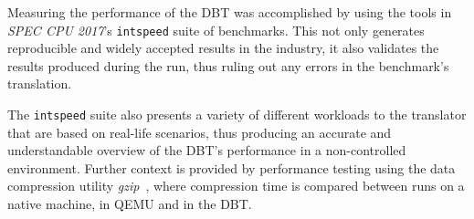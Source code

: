 
\begin{comment}
\begin{figure}[h]
	\centering
	\begin{tikzpicture}
		\begin{axis}[%
			title = {Example bar graph},
			ybar,
			area legend,
			ylabel = {Value in some unit},
			xtick = data,
			xtick style = {draw = none},
			ytick = {0, 2500, 5000, 7500, 10000, 12500},
			scaled y ticks = false,
			symbolic x coords={First category, Second category, Third category},
			ymin = 0, ymax = 12500,
			ymajorgrids = true,
			height = 6.0cm,
			width = \linewidth,
			legend style = {
				at = {(0.5, -0.25)},
				anchor = north,
				legend columns = 3,
				column sep = 0.2cm
			}
		]	
			\addplot+ [
				fill=era-dbt-1,
				draw=black
			] coordinates {
				(First category, 3061)
				(Second category, 10930)
				(Third category, 10971)
			};
			
			\addplot+ [
				fill=era-qemu,
				draw=black
			] coordinates {
				(First category, 3061)
				(Second category, 9092)
				(Third category, 5042)
			};
			
			\addplot+ [
				fill=era-native,
				draw=black
			] coordinates {
				(First category, 4043)
				(Second category, 6092)
				(Third category, 7971)
			};

			
			\legend{First series, Second series, Third series}
		\end{axis}
	\end{tikzpicture}
	\caption{I am an example figure. If you're reading the submitted document, someone forgot to remove me.}
\end{figure}
\end{comment}


Measuring the performance of the DBT was accomplished by using the tools in \textit{SPEC CPU 2017}'s \texttt{intspeed} suite of benchmarks.
This not only generates reproducible and widely accepted results in the industry, it also validates the results produced during the run, thus ruling out any errors in the benchmark's translation.

The \texttt{intspeed} suite also presents a variety of different workloads to the translator that are based on real-life scenarios, thus producing an accurate and understandable overview of the DBT's performance in a non-controlled environment.
Further context is provided by performance testing using the data compression utility \textit{gzip}~\cite{gzip}, where compression time is compared between runs on a native machine, in QEMU and in the DBT\@.

